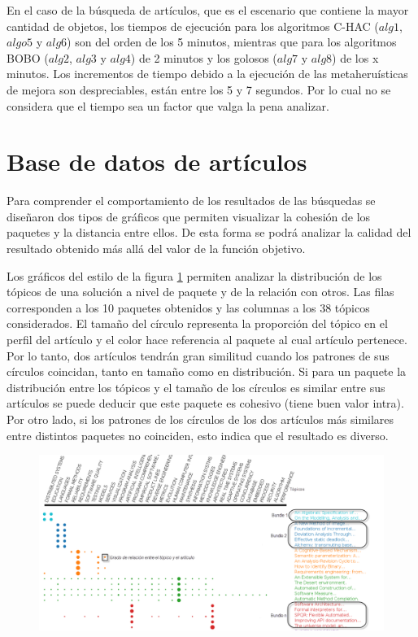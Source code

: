 En el caso de la búsqueda de artículos, que es el escenario que contiene la mayor cantidad de objetos, los tiempos de ejecución  para los algoritmos C-HAC ($alg1$, $algo5$ y $alg6$) son del orden de los 5 minutos, mientras que para los algoritmos BOBO ($alg2$, $alg3$ y $alg4$) de 2 minutos y los golosos ($alg7$ y $alg8$) de los x minutos. Los incrementos de tiempo debido a la ejecución de las metaheruísticas de mejora son despreciables, están entre los 5 y 7 segundos. Por lo cual no se considera que el tiempo sea un factor que valga la pena analizar.

\section{Base de datos de artículos}
Para comprender el comportamiento de los resultados de las búsquedas se diseñaron dos tipos de gráficos que permiten visualizar la cohesión de los paquetes y la distancia entre ellos. De esta forma se podrá analizar la calidad del resultado obtenido más allá del valor de la función objetivo.

Los gráficos del estilo de la figura \ref{res:img-explain-bars} permiten analizar la distribución de los tópicos de una solución a nivel de paquete y de la relación con otros. Las filas corresponden a los 10 paquetes obtenidos y las columnas a los 38 tópicos considerados. El tamaño del círculo representa la proporción del tópico en el perfil del artículo y el color hace referencia al paquete al cual artículo pertenece. Por lo tanto, dos artículos tendrán gran similitud cuando los patrones de sus círculos coincidan, tanto en tamaño como en distribución. Si para un paquete la distribución entre los tópicos y el tamaño de los círculos es similar entre sus artículos se puede deducir que este paquete es cohesivo (tiene buen valor intra). Por otro lado, si los patrones de los círculos de los dos artículos más similares entre distintos paquetes no coinciden, esto indica que el resultado es diverso.
\begin{figure}[H]
  \centering
    \includegraphics[width=1\textwidth]{img/explain-bars.png}
  \caption{}
  \label{res:img-explain-bars}
\end{figure}

